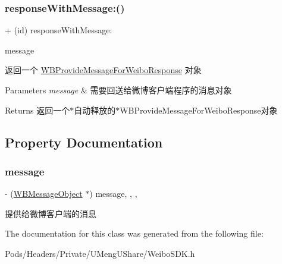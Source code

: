 \subsubsection{\texorpdfstring{response\+With\+Message\+:()}{responseWithMessage:()}\hspace{0.1cm}{\footnotesize\ttfamily [3/3]}}
{\footnotesize\ttfamily + (id) response\+With\+Message\+: \begin{DoxyParamCaption}\item[{(\mbox{\hyperlink{interface_w_b_message_object}{W\+B\+Message\+Object}} $\ast$)}]{message }\end{DoxyParamCaption}}

返回一个 \mbox{\hyperlink{interface_w_b_provide_message_for_weibo_response}{W\+B\+Provide\+Message\+For\+Weibo\+Response}} 对象 
\begin{DoxyParams}{Parameters}
{\em message} & 需要回送给微博客户端程序的消息对象 \\
\hline
\end{DoxyParams}
\begin{DoxyReturn}{Returns}
返回一个$\ast$自动释放的$\ast$\+W\+B\+Provide\+Message\+For\+Weibo\+Response对象 
\end{DoxyReturn}


\subsection{Property Documentation}
\mbox{\label{interface_w_b_provide_message_for_weibo_response_af7341f4a118855d17956ae6629217c26}} 
\subsubsection{\texorpdfstring{message}{message}}
{\footnotesize\ttfamily -\/ (\mbox{\hyperlink{interface_w_b_message_object}{W\+B\+Message\+Object}} $\ast$) message\hspace{0.3cm}{\ttfamily [read]}, {\ttfamily [write]}, {\ttfamily [nonatomic]}, {\ttfamily [strong]}}

提供给微博客户端的消息 

The documentation for this class was generated from the following file\+:\begin{DoxyCompactItemize}
\item 
Pods/\+Headers/\+Private/\+U\+Meng\+U\+Share/Weibo\+S\+D\+K.\+h\end{DoxyCompactItemize}
